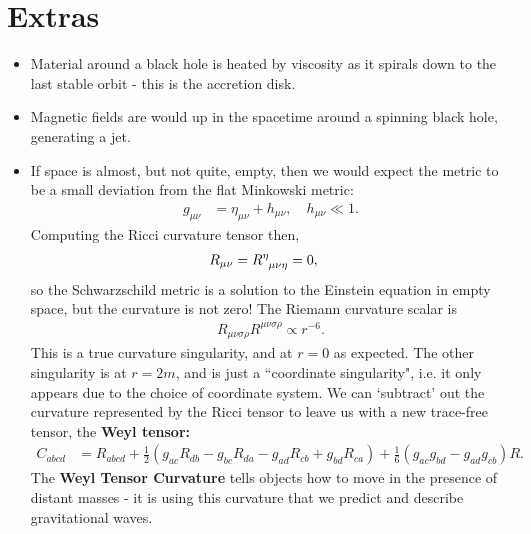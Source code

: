 \documentclass[a4paper, 11pt, normalem]{report}
\begin{document}
\section{Extras}
\begin{itemize}
    \item Material around a black hole is heated by viscosity as it spirals down to the last stable orbit - this is the accretion disk. 
    \item Magnetic fields are would up in the spacetime around a spinning black hole, generating a jet. 
    \item If space is almost, but not quite, empty, then we would expect the metric to be a small deviation from the flat Minkowski metric:
        \begin{align}
            g_{\mu\nu} &= \eta_{\mu\nu} + h_{\mu\nu},\quad h_{\mu\nu}\ll1.
        \end{align}
        Computing the Ricci curvature tensor then, 
        \begin{align}
            R_{\mu\nu} &= \tensor{R}{^\eta_{\mu\nu\eta}} = 0,
        \end{align}
        so the Schwarzschild metric is a solution to the Einstein equation in empty space, but the curvature is not zero!
        The Riemann curvature scalar is
        \begin{align}
            R_{\mu\nu\sigma\rho}R^{\mu\nu\sigma\rho} \propto r^{-6}.
        \end{align}
        This is a true curvature singularity, and at $r=0$ as expected. 
        The other singularity is at $r=2m$, and is just a ``coordinate singularity", i.e. it only appears due to the choice of coordinate system. 
        We can `subtract' out the curvature represented by the Ricci tensor to leave us with a new trace-free tensor, the \textbf{Weyl tensor:}
        \begin{align}
            C_{abcd} &= R_{abcd} + \frac12\left(g_{ac}R_{db}-g_{bc}R_{da}-g_{ad}R_{cb}+g_{bd}R_{ca}\right) + \frac16\left(g_{ac}g_{bd}-g_{ad}g_{cb}\right)R. 
        \end{align}
        The \textbf{Weyl Tensor Curvature} tells objects how to move in the presence of distant masses - it is using this curvature that we predict and describe gravitational waves. 
\end{itemize}
\end{document}
